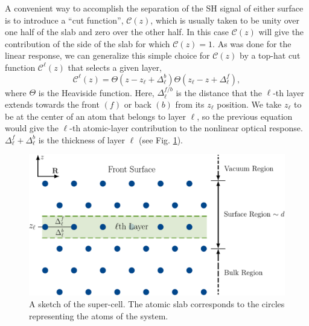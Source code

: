 A convenient way to accomplish the separation of the SH signal of either surface
is to introduce a ``cut function'', ${\boldsymbol{\mathcal{C}}}(z)$, which is
usually taken to be unity over one half of the slab and zero over the other
half.\cite{reiningPRB94} In this case ${\boldsymbol{\mathcal{C}}}(z)$ will give
the contribution of the side of the slab for which
${\boldsymbol{\mathcal{C}}}(z)=1$. As was done for the linear
response,\cite{mendozaPRB06} we can generalize this simple choice for
${\boldsymbol{\mathcal{C}}}(z)$ by a top-hat cut function
${\boldsymbol{\mathcal{C}}}^\ell(z)$ that selects a given layer,
\begin{equation}
{\boldsymbol{\mathcal{C}}}^\ell(z)=\Theta(z-z_\ell+\Delta_\ell^{b})  
            \Theta(z_\ell-z+\Delta_\ell^f),
\label{sz}
\end{equation} 
where $\Theta$ is the Heaviside function. Here, $\Delta_\ell^{f/b}$ is the
distance that the $\ell$-th layer extends towards the front $(f)$ or back $(b)$
from its $z_\ell$ position. We take $z_\ell$ to be at the center of an atom that
belongs to layer $\ell$, so the previous equation would give the $\ell$-th
atomic-layer contribution to the nonlinear optical response.
$\Delta_{\ell}^{f}+\Delta_{\ell}^{b}$ is the thickness of layer $\ell$ (see
Fig. \ref{fslab}).

\begin{figure}[b]
\centering
\includegraphics[scale=.7]{content/figures/diag-slab}
\caption[A sketch of the super-cell.]
{A sketch of the super-cell. The atomic slab corresponds to the circles
representing the atoms of the system.
\label{fslab}} 
\end{figure}


